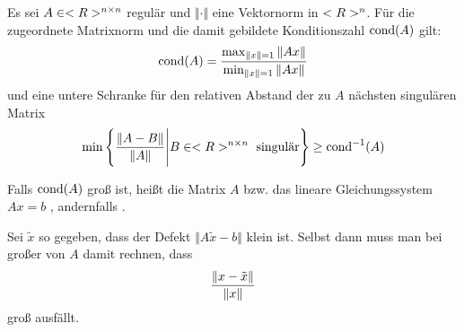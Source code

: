 \begin{proposition}
	Es sei $A\in<R>^{n\times n}$ regulär und $\Vert\cdot\Vert$ eine Vektornorm in $<R>^n$. Für die zugeordnete Matrixnorm und die damit gebildete Konditionszahl $\operatorname{cond}(A)$ gilt:
	\begin{align}
		\operatorname{cond}(A) = \frac{\max_{\Vert x\Vert = 1}\Vert Ax\Vert}{\min_{\Vert x\Vert = 1}\Vert Ax\Vert}\notag
	\end{align}
	und eine untere Schranke für den relativen Abstand der zu $A$ nächsten singulären Matrix
	\begin{align}
		\min\left\lbrace \frac{\Vert A-B\Vert}{\Vert A\Vert} \Bigg| B\in<R>^{n\times n}\text{ singulär}\right\rbrace  \ge \operatorname{cond}^{-1}(A)\notag
	\end{align}
\end{proposition}

\begin{remark}
	Falls $\operatorname{cond}(A)$ groß ist, heißt die Matrix $A$ bzw. das lineare Gleichungssystem $Ax=b$ , andernfalls .
\end{remark}

Sei $\tilde{x}$ so gegeben, dass der Defekt $\Vert A\tilde{x}-b\Vert$ klein ist. Selbst dann muss man bei großer von $A$ damit rechnen, dass
\begin{align}
	\frac{\Vert x-\tilde{x}\Vert}{\Vert x\Vert}\notag
\end{align}
groß ausfällt.
